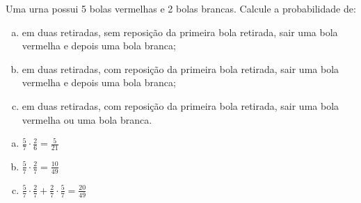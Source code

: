 \begin{ex}
Uma urna possui 5 bolas vermelhas e 2 bolas brancas. Calcule a probabilidade de:
   \begin{enumerate}[(a)]
   \item em duas retiradas, sem reposição da primeira bola retirada, sair uma bola vermelha e depois uma bola branca;
   \item em duas retiradas, com reposição da primeira bola retirada, sair uma bola vermelha e depois uma bola branca;
   \item em duas retiradas, com reposição da primeira bola retirada, sair uma bola vermelha ou uma bola branca.
   \end{enumerate}
     \begin{sol}
      \phantom{A} 
       \begin{enumerate} [(a)]
           \item $\frac{5}{7}\cdot\frac{2}{6}=\frac{5}{21}$
           \item $\frac{5}{7}\cdot\frac{2}{7}=\frac{10}{49}$
           \item $\frac{5}{7}\cdot\frac{2}{7}+\frac{2}{7}\cdot\frac{5}{7}=\frac{20}{49}$
       \end{enumerate}
     \end{sol}
\end{ex}